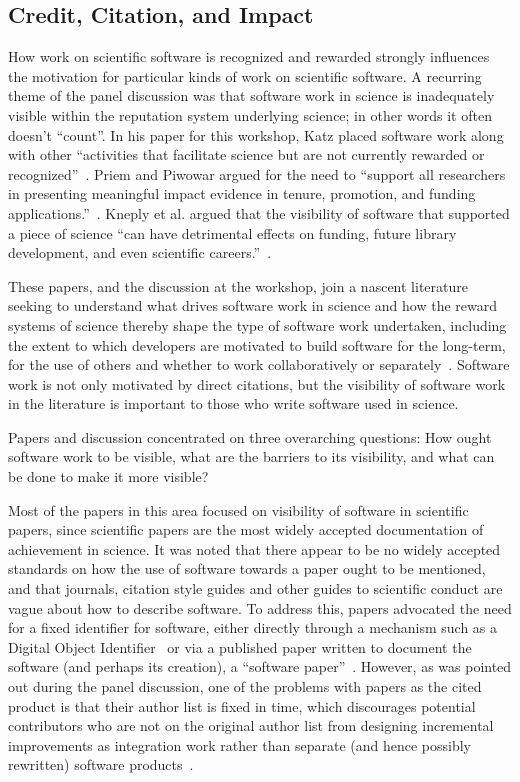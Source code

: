 \documentclass[11pt, oneside]{amsart}
\begin{document}
\subsection{Credit, Citation, and Impact}

How work on scientific software is recognized and rewarded strongly influences the motivation for particular kinds of work
on scientific software. A recurring theme of the panel discussion was
that software work in science is
inadequately visible within the reputation
system underlying science; in other words it often doesn't ``count''. In his paper for this workshop, Katz placed
software work along with other ``activities that facilitate science
but are not currently rewarded or
recognized''~\cite{Katz_WSSSPE}. Priem and Piwowar argued for the need
to ``support all researchers in presenting meaningful impact evidence
in tenure, promotion, and funding applications.''~\cite{Priem_WSSSPE}.
Kneply et al. argued that the visibility of software that supported a
piece of science ``can have detrimental effects on funding, future
library development, and even scientific
careers.''~\cite{Knepley_WSSSPE}.

These papers, and the discussion at the workshop, join a nascent
literature seeking to understand what drives software work in science
and how the reward systems of science thereby shape the type of
software work undertaken, including the extent to which developers are
motivated to build software for the long-term, for the use of others
and whether to work collaboratively or
separately~\cite{howison_incentives_2013, howison_scientific_2011,
  bietz_synergizing_2010}. Software work is not only motivated by
direct citations, but the visibility of software work in the
literature is important to those who write software used in science.

Papers and discussion concentrated on three overarching questions: How ought software
work to be visible, what are the barriers to its visibility, and what
can be done to make it more visible?

Most of the papers in this area focused on visibility of software in
scientific papers, since scientific papers are the most widely
accepted documentation of achievement in science. It was noted that
there appear to be no widely accepted standards on how the use of
software towards a paper ought to be mentioned, and that journals,
citation style guides and other guides to scientific conduct are vague
about how to describe software. To address this, papers advocated the
need for a fixed identifier for software, either directly through a
mechanism such as a Digital Object
Identifier~\cite{Katz_WSSSPE,Knepley_WSSSPE} or via a published paper
written to document the software (and perhaps its creation), a
``software paper''~\cite{Chue_Hong_WSSSPE}. However, as was pointed
out during the panel discussion, one of the problems with papers as
the cited product is that their author list is fixed in time, which
discourages potential contributors who are not on the original author
list from designing incremental improvements as integration work
rather than separate (and hence possibly rewritten) software
products~\cite{howison_incentives_2013}.
\end{document}
